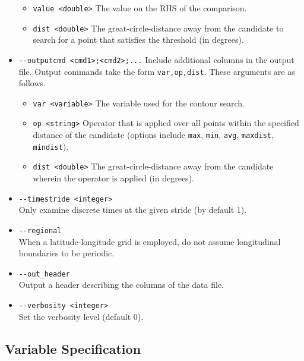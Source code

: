 \documentclass[gmdd, hvmath]{copernicus}
\begin{document}
\begin{itemize}
\begin{itemize}
\item[] \texttt{value <double>}  The value on the RHS of the comparison.
\item[] \texttt{dist <double>}  The great-circle-distance away from the candidate to search for a point that satisfies the threshold (in degrees).
\end{itemize}
\item[] \texttt{-\;\!\!-outputcmd <cmd1>;<cmd2>;...}  Include additional columns in the output file.  Output commands take the form \texttt{var,op,dist}. These arguments are as follows.
\begin{itemize}
\item[] \texttt{var <variable>}  The variable used for the contour search.
\item[] \texttt{op <string>}  Operator that is applied over all points within the specified distance of the candidate (options include \texttt{max}, \texttt{min}, \texttt{avg}, \texttt{maxdist}, \texttt{mindist}).
\item[] \texttt{dist <double>}  The great-circle-distance away from the candidate wherein the operator is applied (in degrees).
\end{itemize}
\item[] \texttt{-\;\!\!-timestride <integer>} \\ Only examine discrete times at the given stride (by default 1).
\item[] \texttt{-\;\!\!-regional} \\ When a latitude-longitude grid is employed, do not assume longitudinal boundaries to be periodic.
\item[] \texttt{-\;\!\!-out\_header} \\ Output a header describing the columns of the data file.
\item[] \texttt{-\;\!\!-verbosity <integer>} \\ Set the verbosity level (default 0).
\end{itemize}

\subsection{Variable Specification} \label{sec:VariableSpecification}
\end{document}
